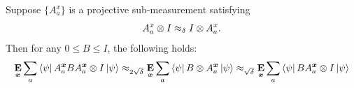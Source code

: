 \begin{proposition}  \label{prop:switch-sandwich}
  Suppose $\{A^x_a\}$ is a projective sub-measurement
  satisfying
  \begin{equation}
    A^x_a \otimes I \approx_{\delta} I \otimes A^x_a. \label{eq:Aapproxd}
  \end{equation}
  Then for any $0 \leq B \leq I$, the following holds:
  \begin{equation}
    \mathop{\bf E\/}_{{\boldsymbol{x}}}\sum_a \bra{\psi} A^{{\boldsymbol{x}}}_a B A^{{\boldsymbol{x}}}_a \otimes I \ket{\psi}
    \approx_{2\sqrt{\delta}} \mathop{\bf E\/}_{{\boldsymbol{x}}} \sum_a \bra{\psi} B
    \otimes A^{{\boldsymbol{x}}}_a
    \ket{\psi} \approx_{\sqrt{\delta}} \mathop{\bf E\/}_{{\boldsymbol{x}}} \sum_a \bra{\psi}
    BA^{{\boldsymbol{x}}}_a \otimes I \ket{\psi} \label{eq:switch-sandwich} \end{equation}

\end{proposition}

